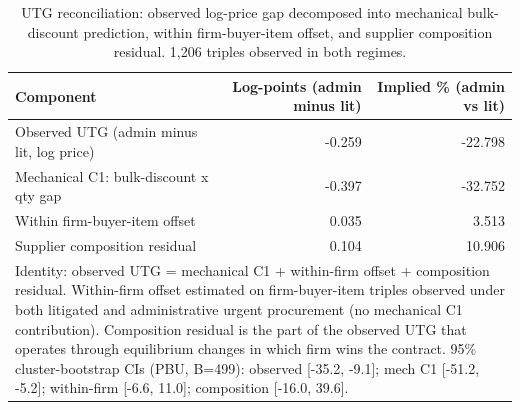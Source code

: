 \begin{table}

\caption{\label{tab:utg_reconciliation}UTG reconciliation: observed log-price gap decomposed into mechanical bulk-discount prediction, within firm-buyer-item offset, and supplier composition residual. 1,206 triples observed in both regimes.}
\centering
\begin{tabular}[t]{lrr}
\toprule
Component & Log-points (admin minus lit) & Implied \% (admin vs lit)\\
\midrule
Observed UTG (admin minus lit, log price) & -0.259 & -22.798\\
Mechanical C1: bulk-discount x qty gap & -0.397 & -32.752\\
Within firm-buyer-item offset & 0.035 & 3.513\\
Supplier composition residual & 0.104 & 10.906\\
\bottomrule
\multicolumn{3}{l}{\rule{0pt}{1em}Identity: observed UTG = mechanical C1 + within-firm offset + composition residual. Within-firm offset estimated on firm-buyer-item triples observed under both litigated and administrative urgent procurement (no mechanical C1 contribution). Composition residual is the part of the observed UTG that operates through equilibrium changes in which firm wins the contract. 95\% cluster-bootstrap CIs (PBU, B=499): observed [-35.2, -9.1]; mech C1 [-51.2, -5.2]; within-firm [-6.6, 11.0]; composition [-16.0, 39.6].}\\
\end{tabular}
\end{table}

